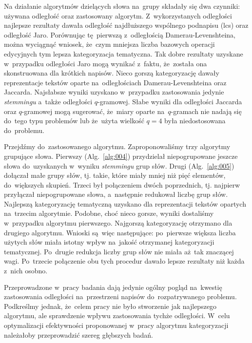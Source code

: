 \documentclass{praca1}
\begin{document}
Na działanie algorytmów dzielących słowa na~grupy składały się dwa czynniki: używana odległość oraz zastosowany algorytm. Z~wykorzystanych odległości najlepsze rezultaty dawała odległość najdłuższego wspólnego podnapisu (lcs) oraz odległość Jaro. Porównując tę~pierwszą z~odległością Damerau-Levenshteina, można wyciągnąć wniosek, że~czym mniejsza liczba bazowych operacji edycyjnych tym lepsza kategoryzacja tematyczna. Tak dobre rezultaty uzyskane w~przypadku odległości Jaro mogą wynikać z~faktu, że~została ona skonstruowana dla krótkich napisów. Nieco gorszą kategoryzację dawały reprezentacje tekstów oparte na~odległościach Damerau-Levenshteina oraz Jaccarda. Najsłabsze wyniki uzyskano w~przypadku zastosowania jedynie \emph{stemmingu} a~także odległości $q$-gramowej. Słabe wyniki dla odległości Jaccarda oraz $q$-gramowej mogą sugerować, że~miary oparte na~$q$-gramach nie nadają się do~tego typu problemów lub że~użyta wielkość $q=4$ była niedostosowana do~problemu.

Przejdźmy do~zastosowanego algorytmu. Zaproponowaliśmy trzy algorytmy grupujące słowa. Pierwszy (Alg.~\ref{alg:004}) przydzielał niepogrupowane jeszcze słowa do~uzyskanych w~wyniku \emph{stemmingu} grup słów. Drugi (Alg.~\ref{alg:005}) dołączał małe grupy słów, tj. takie, które miały mniej niż pięć elementów, do~większych skupień. Trzeci był połączeniem dwóch poprzednich, tj. najpierw przyłączał niepogrupowane słowa, a~następnie redukował liczbę grup słów. Najlepszą kategoryzację tematyczną uzyskano dla reprezentacji tekstów opartych na~trzecim algorytmie. Podobne, choć nieco gorsze, wyniki dostaliśmy w~przypadku algorytmu pierwszego. Najgorszą kategoryzację otrzymano dla drugiego algorytmu. Wnioski są~więc następujące: po~pierwsze większa liczba użytych słów miała istotny wpływ na~jakość otrzymanej kategoryzacji tematycznej. Po~drugie redukcja liczby grup słów nie miała aż~tak znaczącej wagi. Po~trzecie połączenie obu tych procedur dawało lepsze rezultaty niż każda z~nich osobno.

Przeprowadzone w~pracy badania dają jedynie ogólny pogląd na~kwestię zastosowania odległości na~przestrzeni napisów do~rozpatrywanego problemu. Podkreślmy jednak, że~celem pracy nie było stworzenie jak najlepszego algorytmu, ale sprawdzenie wpływu zastosowania tychże odległości. W~celu optymalizacji efektywności proponowanej w~pracy algorytmu kategoryzacji należałoby przeprowadzić szereg głębszych badań.
\end{document}
